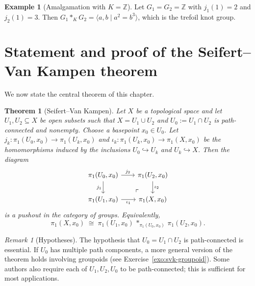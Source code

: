 \documentclass[12pt,a4paper,openany]{book}
\theoremstyle{definition}
\newtheorem{example}[definition]{Example}
\theoremstyle{plain}
\newtheorem{theorem}[definition]{Theorem}
\theoremstyle{remark}
\newtheorem{remark}[definition]{Remark}
\newcommand{\Z}{\mathbb{Z}}
\begin{document}
\begin{example}[Amalgamation with $K = \Z$]\label{ex:amalgam-Z}
  Let $G_1 = G_2 = \Z$ with $j_1(1) = 2$ and $j_2(1) = 3$.  Then
  $G_1 *_K G_2 = \langle a, b \mid a^2 = b^3 \rangle$, which is the trefoil
  knot group.
\end{example}

\section{Statement and proof of the Seifert--Van Kampen theorem}\label{sec:svk-statement}

We now state the central theorem of this chapter.

\begin{theorem}[Seifert--Van Kampen]\label{thm:svk}
  Let $X$ be a topological space and let $U_1, U_2 \subseteq X$ be open
  subsets such that $X = U_1 \cup U_2$ and $U_0 := U_1 \cap U_2$ is
  path-connected and nonempty.  Choose a basepoint $x_0 \in U_0$.  Let
  $j_k\colon \pi_1(U_0, x_0) \to \pi_1(U_k, x_0)$ and
  $\iota_k\colon \pi_1(U_k, x_0) \to \pi_1(X, x_0)$ be the homomorphisms
  induced by the inclusions $U_0 \hookrightarrow U_k$ and
  $U_k \hookrightarrow X$.  Then the diagram
  \[
    \begin{tikzcd}[column sep=2em]
      \pi_1(U_0, x_0) \ar[r,"j_2"] \ar[d,"j_1"'] &
        \pi_1(U_2, x_0) \ar[d,"\iota_2"] \\
      \pi_1(U_1, x_0) \ar[r,"\iota_1"'] &
        \pi_1(X, x_0) \ar[ul, phantom, "\ulcorner" very near start]
    \end{tikzcd}
  \]
  is a pushout in the category of groups.  Equivalently,
  \[
    \pi_1(X, x_0) \;\cong\; \pi_1(U_1, x_0) \,*_{\pi_1(U_0, x_0)}\, \pi_1(U_2, x_0).
  \]
\end{theorem}

\begin{remark}[Hypotheses]\label{rem:svk-hypotheses}
  The hypothesis that $U_0 = U_1 \cap U_2$ is path-connected is essential.
  If $U_0$ has multiple path components, a more general version of the theorem
  holds involving groupoids (see Exercise~\ref{exo:svk-groupoid}).  Some
  authors also require each of $U_1, U_2, U_0$ to be path-connected; this is
  sufficient for most applications.
\end{remark}
\end{document}
